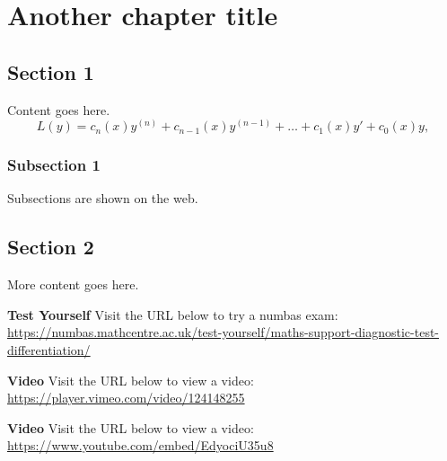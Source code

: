 \documentclass[a4paper]{report}
\newcommand{\numbas}[2][Visit the URL below to try a numbas exam:]{\bigskip\noindent\textbf{Test Yourself} \textrm{#1}\\\expandafter\url{#2}\par}
\newcommand{\vimeo}[2][Visit the URL below to view a video:]{\bigskip\noindent\textbf{Video} \textrm{#1}\\\expandafter\url{https://player.vimeo.com/video/#2}\par}
\newcommand{\youtube}[2][Visit the URL below to view a video:]{\bigskip\noindent\textbf{Video} \textrm{#1}\\\expandafter\url{https://www.youtube.com/embed/#2}\par}
\begin{document}
\setcounter{chapter}{1}
\chapter{Another chapter title}

\section{Section 1}
Content goes here.
\begin{equation}
\label{eqn:intro:linearo}
L(y)= c_n(x)y^{(n)} + c_{n-1}(x)y^{(n-1)}+\ldots + c_1(x)y' + c_0(x)y,
\end{equation}

\subsection{Subsection 1}
Subsections are shown on the web.
\section{Section 2}
More content goes here.

\numbas{https://numbas.mathcentre.ac.uk/test-yourself/maths-support-diagnostic-test-differentiation/}
\vimeo{124148255}
\youtube{EdyociU35u8}
\end{document}
